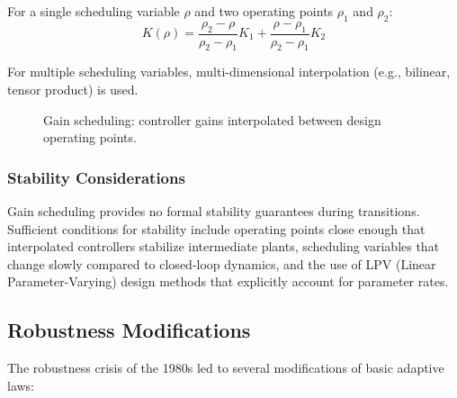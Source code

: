 For a single scheduling variable $\rho$ and two operating points $\rho_1$ and $\rho_2$:
\begin{equation}
K(\rho) = \frac{\rho_2 - \rho}{\rho_2 - \rho_1}K_1 + \frac{\rho - \rho_1}{\rho_2 - \rho_1}K_2
\label{eq:gain_interpolation}
\end{equation}

For multiple scheduling variables, multi-dimensional interpolation (e.g., bilinear, tensor product) is used.

\begin{figure}[H]
\centering
{}
\caption{Gain scheduling: controller gains interpolated between design operating points.}
\label{fig:gain_scheduling}
\end{figure}

\subsubsection{Stability Considerations}

Gain scheduling provides no formal stability guarantees during transitions. Sufficient conditions for stability include operating points close enough that interpolated controllers stabilize intermediate plants, scheduling variables that change slowly compared to closed-loop dynamics, and the use of LPV (Linear Parameter-Varying) design methods that explicitly account for parameter rates.

\subsection{Robustness Modifications}

The robustness crisis of the 1980s led to several modifications of basic adaptive laws:


